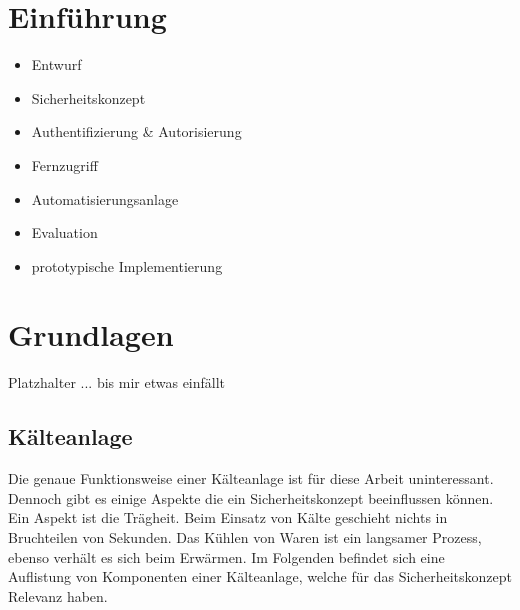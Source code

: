 \documentclass[11pt,a4paper]{report}
\begin{document}

\tableofcontents
\clearpage 


\chapter{Einführung} \label{chap:intro}

\begin{itemize}
\item Entwurf 
\item Sicherheitskonzept
\item Authentifizierung \& Autorisierung
\item Fernzugriff
\item Automatisierungsanlage
\item Evaluation
\item prototypische Implementierung
\end{itemize}

\chapter{Grundlagen} \label{chap:basics}

Platzhalter ... bis mir etwas einfällt

\section{Kälteanlage}

Die genaue Funktionsweise einer Kälteanlage ist für diese Arbeit uninteressant. Dennoch gibt es einige Aspekte die ein Sicherheitskonzept beeinflussen können. Ein Aspekt ist die Trägheit. Beim Einsatz von Kälte geschieht nichts in Bruchteilen von Sekunden. Das Kühlen von Waren ist ein langsamer Prozess, ebenso verhält es sich beim Erwärmen. Im Folgenden befindet sich eine Auflistung von Komponenten einer Kälteanlage, welche für das Sicherheitskonzept Relevanz haben.
\end{document}
